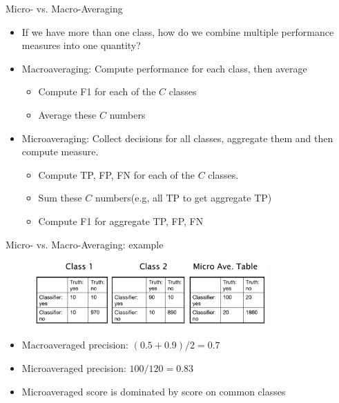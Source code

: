 \documentclass[serif, aspectratio=169]{beamer}
\begin{document}
\begin{frame}{Micro- vs. Macro-Averaging}
    \begin{itemize}
        \item If we have more than one class, how do we combine
multiple performance measures into one quantity?
        \item \textcolor{deepred}{Macroaveraging}: Compute performance for each class, then average
        \begin{itemize}
            \item Compute F1 for each of the $C$ classes
            \item Average these $C$ numbers
        \end{itemize}
        \item \textcolor{deepred}{Microaveraging}: Collect decisions for all classes, aggregate them and then compute measure.
        \begin{itemize}
            \item Compute TP, FP, FN for each of the $C$ classes.
            \item Sum these $C$ numbers(e.g, all TP to get aggregate TP)
            \item Compute F1 for aggregate TP, FP, FN
        \end{itemize}
    \end{itemize}
\end{frame}
\begin{frame}{Micro- vs. Macro-Averaging: example}
    \begin{figure}[h]
            \centering
            
            \includegraphics[width=0.8\textwidth]{pic/MicroVsMacro.png}
            \end{figure}
            
    \begin{itemize}
        \item Macroaveraged precision: $(0.5 + 0.9)/2 = 0.7$
        \item Microaveraged precision: $100/120 = 0.83$
        \item Microaveraged score is dominated by score on common classes
    \end{itemize}
\end{frame}
\end{document}
